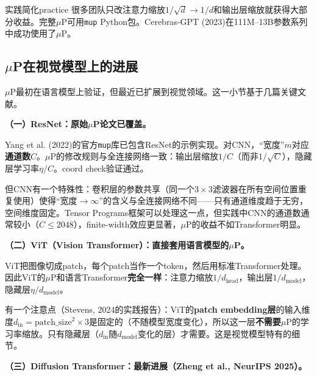 \documentclass[11pt,a4paper]{article}
\begin{document}
\begin{remark}{实践简化}{practice}
很多团队只改注意力缩放$1/\sqrt{d}\to 1/d$和输出层缩放就获得大部分收益。完整$\mu$P可用\texttt{mup} Python包。Cerebras-GPT (2023)在111M--13B参数系列中成功使用了$\mu$P。
\end{remark}

\subsection{$\mu$P在视觉模型上的进展}

$\mu$P最初在语言模型上验证，但最近已扩展到视觉领域。这一小节基于几篇关键文献。

\textbf{（一）ResNet：原始$\mu$P论文已覆盖。}

Yang et al. (2022)的官方\texttt{mup}库已包含ResNet的示例实现。对CNN，``宽度''$m$对应\textbf{通道数}$C$。$\mu$P的修改规则与全连接网络一致：输出层缩放$1/C$（而非$1/\sqrt{C}$），隐藏层学习率$\eta/C$。coord check验证通过。

但CNN有一个特殊性：卷积层的参数共享（同一个$3\times 3$滤波器在所有空间位置重复使用）使得``宽度$\to\infty$''的含义与全连接网络不同——只有通道维度趋于无穷，空间维度固定。Tensor Programs框架可以处理这一点，但实践中CNN的通道数通常较小（$C\le 2048$），finite-width效应更显著，$\mu$P的收益不如Transformer明显。

\medskip
\textbf{（二）ViT（Vision Transformer）：直接套用语言模型的$\mu$P。}

ViT把图像切成patch，每个patch当作一个token，然后用标准Transformer处理。因此ViT的$\mu$P和语言Transformer\textbf{完全一样}：注意力缩放$1/d_{\text{head}}$，输出层$1/d_{\text{model}}$，隐藏层$\eta/d_{\text{model}}$。

有一个注意点（Stevens, 2024的实践报告）：ViT的\textbf{patch embedding层}的输入维度$d_{\text{in}} = \text{patch\_size}^2\times 3$是固定的（不随模型宽度变化），所以这一层\textbf{不需要}$\mu$P的学习率缩放。只有隐藏层（$d_{\text{in}}$随$d_{\text{model}}$变化的层）才需要。这是视觉模型特有的细节。

\medskip
\textbf{（三）Diffusion Transformer：最新进展（Zheng et al., NeurIPS 2025）。}
\end{document}
